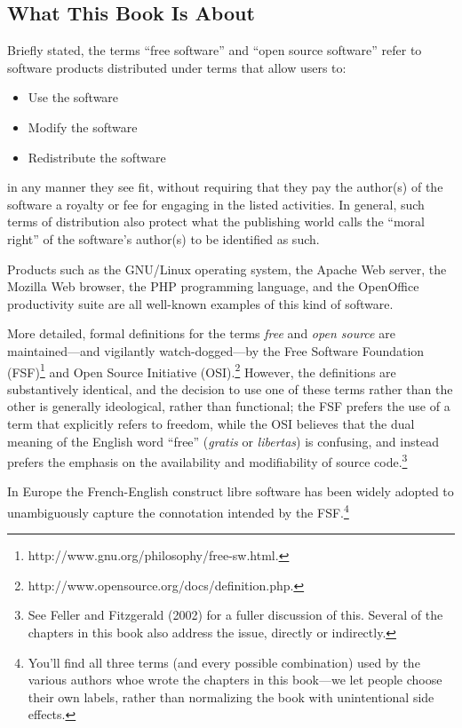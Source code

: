 \documentclass{mitpress}
\begin{document}
\begin{introduction}


\section*{What This Book Is About}
Briefly stated, the terms ``free software'' and ``open source software'' refer
to software products distributed under terms that allow users to:

\begin{itemize}

\item Use the software

\item Modify the software

\item Redistribute the software
\end{itemize}
in any manner they see fit, without requiring that they pay the author(s)
of the software a royalty or fee for engaging in the listed activities. In
general, such terms of distribution also protect what the publishing world
calls the ``moral right'' of the software's author(s) to be identified as such.

Products such as the GNU/Linux operating system, the Apache Web server,
the Mozilla Web browser, the PHP programming language, and the
OpenOffice productivity suite are all well-known examples of this kind of
software.

More detailed, formal definitions for the terms {\it free} and {\it
open source} are
maintained---and vigilantly watch-dogged---by the Free Software Foundation
(FSF)\footnote{http://www.gnu.org/philosophy/free-sw.html.}
 and Open Source Initiative (OSI).\footnote{http://www.opensource.org/docs/definition.php.} However, the definitions are
substantively identical, and the decision to use one of these terms rather
than the other is generally ideological, rather than functional; the FSF
prefers the use of a term that explicitly refers to freedom, while the OSI
believes that the dual meaning of the English word ``free'' 
({\it gratis} or {\it libertas})
is confusing, and instead prefers the emphasis on the availability and
modifiability of source code.\footnote{See Feller and Fitzgerald (2002)
for a fuller discussion of this. Several of the 
chapters in this book also address the issue, directly or indirectly.}

In Europe the French-English construct libre
software has been widely adopted to unambiguously capture the connotation
intended by the FSF.\footnote{You'll find all three terms
(and every possible combination) used by the various authors
whoe wrote the chapters in this book---we let people choose their
own labels, rather than normalizing the book with unintentional
side effects.}


\end{introduction}
\end{document}
